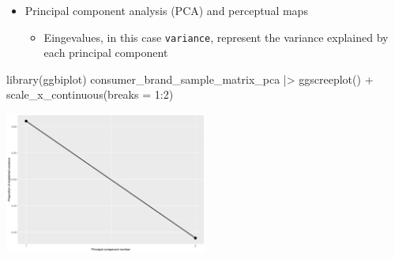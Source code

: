 \documentclass[
  ignorenonframetext,
]{beamer}
\newenvironment{Shaded}{\begin{snugshade}}{\end{snugshade}}
\newcommand{\AttributeTok}[1]{\textcolor[rgb]{0.40,0.45,0.13}{#1}}
\newcommand{\DecValTok}[1]{\textcolor[rgb]{0.68,0.00,0.00}{#1}}
\newcommand{\FunctionTok}[1]{\textcolor[rgb]{0.28,0.35,0.67}{#1}}
\newcommand{\NormalTok}[1]{\textcolor[rgb]{0.00,0.23,0.31}{#1}}
\newcommand{\SpecialCharTok}[1]{\textcolor[rgb]{0.37,0.37,0.37}{#1}}
\providecommand{\tightlist}{%
  \setlength{\itemsep}{0pt}\setlength{\parskip}{0pt}}\usepackage{longtable,booktabs,array}
\begin{document}
\begin{frame}[fragile]{}
\label{section-40}
\begin{itemize}
\item
  Principal component analysis (PCA) and perceptual maps

  \begin{itemize}
  \tightlist
  \item
    Eingevalues, in this case \texttt{variance}, represent the variance
    explained by each principal component
  \end{itemize}
\end{itemize}

\tiny

\begin{Shaded}
\begin{Highlighting}[]
\FunctionTok{library}\NormalTok{(ggbiplot)}
\NormalTok{consumer\_brand\_sample\_matrix\_pca }\SpecialCharTok{|\textgreater{}} 
  \FunctionTok{ggscreeplot}\NormalTok{() }\SpecialCharTok{+}
  \FunctionTok{scale\_x\_continuous}\NormalTok{(}\AttributeTok{breaks =} \DecValTok{1}\SpecialCharTok{:}\DecValTok{2}\NormalTok{)}
\end{Highlighting}
\end{Shaded}

\begin{center}
\includegraphics[width=0.5\textwidth,height=\textheight]{008_reducing_data_complexity_files/figure-beamer/unnamed-chunk-38-1.pdf}
\end{center}
\end{frame}
\end{document}
